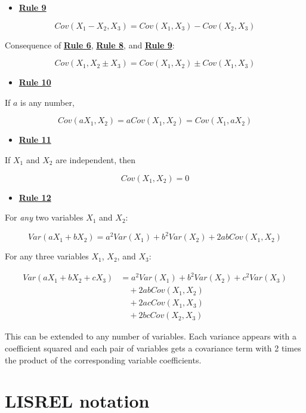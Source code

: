 \documentclass[
]{book}
\providecommand{\tightlist}{%
  \setlength{\itemsep}{0pt}\setlength{\parskip}{0pt}}
\begin{document}
\begin{itemize}
\tightlist
\item
  \href{./covariance.html\#Rule9}{\textbf{Rule 9}}
\end{itemize}

\[
Cov\left(X_{1} - X_{2}, X_{3}\right) = Cov\left(X_{1}, X_{3}\right) - Cov\left(X_{2}, X_{3}\right)  
\]

Consequence of \href{./covariance.html\#Rule6}{\textbf{Rule 6}}, \href{./covariance.html\#Rule8}{\textbf{Rule 8}}, and \href{./covariance.html\#Rule9}{\textbf{Rule 9}}:

\[
Cov\left(X_{1}, X_{2} \pm X_{3}\right) = Cov\left(X_{1}, X_{2}\right) \pm Cov\left(X_{1}, X_{3}\right)  
\]

\begin{itemize}
\tightlist
\item
  \href{./covariance.html\#Rule10}{\textbf{Rule 10}}
\end{itemize}

If \(a\) is any number,

\[
Cov\left(a X_{1}, X_{2}\right) = a Cov\left(X_{1}, X_{2}\right) =  Cov\left(X_{1}, a X_{2}\right)  
\]

\begin{itemize}
\tightlist
\item
  \href{./covariance.html\#Rule11}{\textbf{Rule 11}}
\end{itemize}

If \(X_{1}\) and \(X_{2}\) are independent, then

\[
Cov\left(X_{1}, X_{2}\right) = 0
\]

\begin{itemize}
\tightlist
\item
  \href{./covariance.html\#Rule12}{\textbf{Rule 12}}
\end{itemize}

For \emph{any} two variables \(X_{1}\) and \(X_{2}\):

\[
Var(aX_{1} + bX_{2}) = 
    a^2Var(X_{1}) + b^2Var(X_{2}) + 2abCov(X_{1}, X_{2})
\]

For any three variables \(X_{1}\), \(X_{2}\), and \(X_{3}\):

\begin{align}
Var(aX_{1} + bX_{2} + cX_{3}) &= 
    a^2Var(X_{1}) + b^2Var(X_{2}) + c^2Var(X_{3}) \\
    & \quad + 2abCov(X_{1}, X_{2}) \\
    & \quad + 2acCov(X_{1}, X_{3}) \\
    & \quad + 2bcCov(X_{2}, X_{3})
\end{align}

This can be extended to any number of variables. Each variance appears with a coefficient squared and each pair of variables gets a covariance term with 2 times the product of the corresponding variable coefficients.

\hypertarget{appendix-lisrel}{%
\chapter{LISREL notation}\label{appendix-lisrel}}

  
\end{document}
